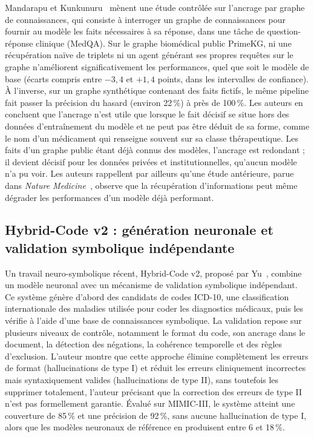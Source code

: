 Mandarapu et Kunkunuru~\cite{mandarapu2026knowledge} mènent une étude contrôlée sur l'ancrage par graphe de connaissances, qui consiste à interroger un graphe de connaissances pour fournir au modèle les faits nécessaires à sa réponse, dans une tâche de question-réponse clinique (MedQA). Sur le graphe biomédical public PrimeKG, ni une récupération naïve de triplets ni un agent générant ses propres requêtes sur le graphe n'améliorent significativement les performances, quel que soit le modèle de base (écarts compris entre $-3{,}4$ et $+1{,}4$ points, dans les intervalles de confiance). À l'inverse, sur un graphe synthétique contenant des faits fictifs, le même pipeline fait passer la précision du hasard (environ 22\,\%) à près de 100\,\%. Les auteurs en concluent que l'ancrage n'est utile que lorsque le fait décisif se situe hors des données d'entraînement du modèle et ne peut pas être déduit de sa forme, comme le nom d'un médicament qui renseigne souvent sur sa classe thérapeutique. Les faits d'un graphe public étant déjà connus des modèles, l'ancrage est redondant ; il devient décisif pour les données privées et institutionnelles, qu'aucun modèle n'a pu voir. Les auteurs rappellent par ailleurs qu'une étude antérieure, parue dans \textit{Nature Medicine}~, observe que la récupération d'informations peut même dégrader les performances d'un modèle déjà performant.

\subsection{Hybrid-Code v2 : génération neuronale et validation symbolique indépendante}

Un travail neuro-symbolique récent, Hybrid-Code v2, proposé par Yu~\cite{hybrid2512v2}, combine un modèle neuronal avec un mécanisme de validation symbolique indépendant. Ce système génère d'abord des candidats de codes ICD-10, une classification internationale des maladies utilisée pour coder les diagnostics médicaux, puis les vérifie à l'aide d'une base de connaissances symbolique. La validation repose sur plusieurs niveaux de contrôle, notamment le format du code, son ancrage dans le document, la détection des négations, la cohérence temporelle et des règles d'exclusion. L'auteur montre que cette approche élimine complètement les erreurs de format (hallucinations de type I) et réduit les erreurs cliniquement incorrectes mais syntaxiquement valides (hallucinations de type II), sans toutefois les supprimer totalement, l'auteur précisant que la correction des erreurs de type II n'est pas formellement garantie. Évalué sur MIMIC-III, le système atteint une couverture de 85\,\% et une précision de 92\,\%, sans aucune hallucination de type I, alors que les modèles neuronaux de référence en produisent entre 6 et 18\,\%.


